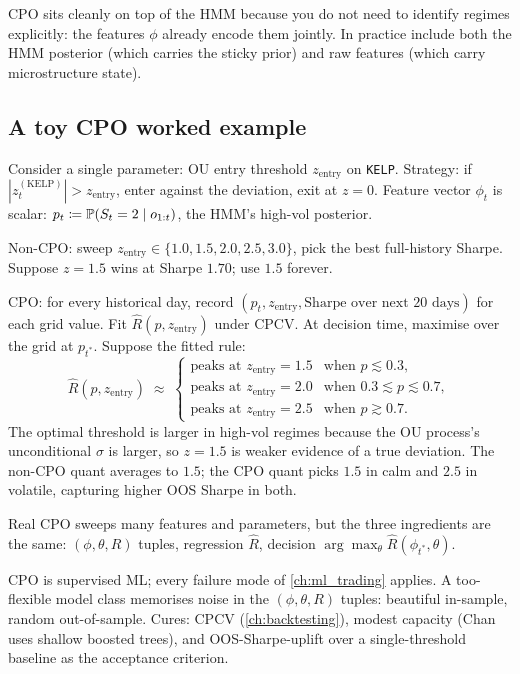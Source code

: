 CPO sits cleanly on top of the HMM because you do not need to
identify regimes explicitly: the features $\phi$ already encode
them jointly. In practice include both the HMM posterior (which
carries the sticky prior) and raw features (which carry
microstructure state).

\subsection{A toy CPO worked example}
\label{subsec:wsw_cpo_worked}

Consider a single parameter: OU entry threshold $z_{\text{entry}}$
on \texttt{KELP}. Strategy: if $|z_t^{(\mathrm{KELP})}| >
z_{\text{entry}}$, enter against the deviation, exit at $z = 0$.
Feature vector $\phi_t$ is scalar: $p_t \coloneqq \mathbb{P}(S_t = 2 \mid
o_{1:t})$, the HMM's high-vol posterior.

Non-CPO: sweep $z_{\text{entry}} \in \{1.0, 1.5, 2.0, 2.5, 3.0\}$,
pick the best full-history Sharpe. Suppose $z = 1.5$ wins at Sharpe
$1.70$; use $1.5$ forever.

CPO: for every historical day, record $(p_t, z_{\text{entry}},
\text{Sharpe over next 20 days})$ for each grid value. Fit
$\hat{R}(p, z_{\text{entry}})$ under CPCV. At decision time,
maximise over the grid at $p_{t^*}$. Suppose the fitted rule:
\begin{equation}
  \hat{R}(p, z_{\text{entry}})
  \;\approx\;
  \begin{cases}
    \text{peaks at } z_{\text{entry}} = 1.5 & \text{when } p \lesssim 0.3, \\
    \text{peaks at } z_{\text{entry}} = 2.0 & \text{when } 0.3 \lesssim p \lesssim 0.7, \\
    \text{peaks at } z_{\text{entry}} = 2.5 & \text{when } p \gtrsim 0.7.
  \end{cases}
  \label{eq:wsw_cpo_rule}
\end{equation}
The optimal threshold is larger in high-vol regimes because the
OU process's unconditional $\sigma$ is larger, so $z = 1.5$ is
weaker evidence of a true deviation. The non-CPO quant averages to
$1.5$; the CPO quant picks $1.5$ in calm and $2.5$ in volatile,
capturing higher OOS Sharpe in both.

Real CPO sweeps many features and parameters, but the three
ingredients are the same: $(\phi, \theta, R)$ tuples, regression
$\hat{R}$, decision $\arg\max_\theta \hat{R}(\phi_{t^*}, \theta)$.

\begin{pitfallbox}
CPO is supervised ML; every failure mode of \cref{ch:ml_trading}
applies. A too-flexible model class memorises noise in the
$(\phi, \theta, R)$ tuples: beautiful in-sample, random
out-of-sample. Cures: CPCV (\cref{ch:backtesting}), modest capacity
(Chan uses shallow boosted trees), and OOS-Sharpe-uplift over a
single-threshold baseline as the acceptance criterion.
\end{pitfallbox}

